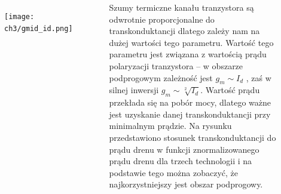 \begin{frame}[t]
    \begin{block}{\dk}
    \end{block}
    \begin{columns}
        \begin{figure}[H]
            \texttt{[image: ch3/gmid\_id.png]} 
        \end{figure}
    
        Szumy termiczne kanału tranzystora są odwrotnie proporcjonalne do transkonduktancji dlatego zależy nam na dużej wartości tego parametru. 
        Wartość tego parametru jest związana z wartością prądu polaryzacji tranzystora -- w obszarze podprogowym zależność jest $g_m\sim I_d$ , zaś w silnej inwersji $g_m\sim\sqrt[2]{I_d}$.
        Wartość prądu przekłada się na pobór mocy, dlatego ważne jest uzyskanie danej transkonduktancji przy minimalnym prądzie. 
        Na rysunku przedstawiono stosunek transkonduktancji do prądu drenu w funkcji znormalizowanego prądu drenu dla trzech technologii i na podstawie tego można zobaczyć, że najkorzystniejszy jest obszar podprogowy.
     \end{columns}
\end{frame}

